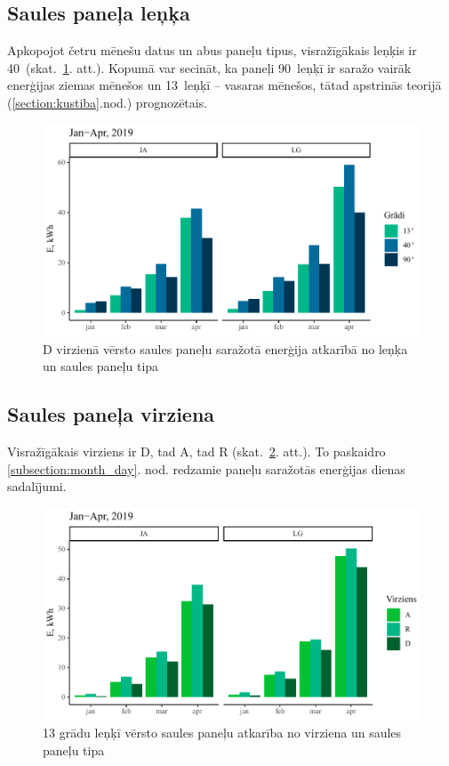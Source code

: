 \subsection{Saules paneļa leņķa}\label{subsection:degree}
Apkopojot četru mēnešu datus un abus paneļu tipus, visražīgākais leņķis ir 40\textdegree ~(skat.~\ref{fig:lg_ja_deg}. att.).
Kopumā var secināt, ka paneļi 90\textdegree ~leņķī ir saražo vairāk enerģijas ziemas mēnešos un 13\textdegree ~leņķī -- vasaras mēnešos, tātad apstrinās teorijā (\ref{section:kustiba}.nod.) prognozētais.
\begin{figure}[h!]
    \centering
    \includegraphics[width=\linewidth]{figures/results/all_degType.pdf}
    \caption{D virzienā vērsto saules paneļu saražotā enerģija atkarībā no leņķa un saules paneļu tipa} \label{fig:lg_ja_deg}
\end{figure}


\subsection{Saules paneļa virziena}\label{subsection:dir}
Visražīgākais virziens ir D, tad A, tad R (skat.~\ref{fig:lg_ja_dir}. att.). To paskaidro \ref{subsection:month_day}. nod. redzamie paneļu saražotās enerģijas dienas sadalījumi.
\begin{figure}[h!]
    \centering
    \includegraphics[width=\linewidth]{figures/results/all_dirType.pdf}
    \caption{13 grādu leņķī vērsto saules paneļu atkarība no virziena un saules paneļu tipa}
    \label{fig:lg_ja_dir}
\end{figure}

